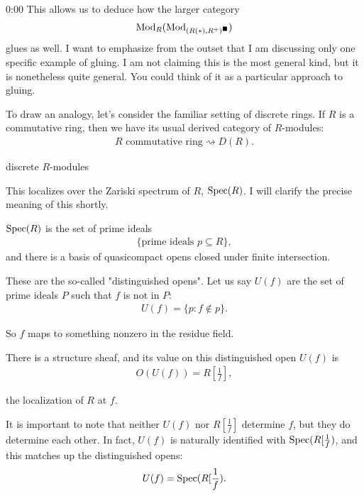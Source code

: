 \begin{unfinished}{0:00}
This allows us to deduce how the larger category
\begin{align*}
\operatorname{Mod}_R (\operatorname{Mod}_{(R(\ast),R^+)^\blacksquare})
\end{align*} 
glues as well. 
I want to emphasize from the outset that I am discussing only one specific example of gluing. I am not claiming this is the most general kind, but it is nonetheless quite general. You could think of it as a particular approach to gluing.

To draw an analogy, let's consider the familiar setting of discrete rings. If $R$ is a commutative ring, then we have its usual derived category of $R$-modules:
\begin{align*}
R \text{ commutative ring} \rightsquigarrow D(R).
\end{align*}

\begin{remark}
discrete $R$-modules
\end{remark}

This localizes over the Zariski spectrum of $R$, $\operatorname{Spec}(R)$. I will clarify the precise meaning of this shortly.

$\operatorname{Spec}(R)$ is the set of prime ideals 
\begin{align*}
\{ \text{prime ideals } p \subseteq R  \},
\end{align*}
and there is a basis of quasicompact opens closed under finite intersection.

These are the so-called "distinguished opens". Let us say $U(f)$ are the set of prime ideals $P$ such that $f$ is not in $P$:
\begin{align*}
U(f) = \{ p: f \notin p \}.
\end{align*}

So $f$ maps to something nonzero in the residue field.

There is a structure sheaf, and its value on this distinguished open $U(f)$ is 
\begin{align*}
O(U(f)) = R[\frac{1}{f}], 
\end{align*}

the localization of $R$ at $f$. 

It is important to note that neither $U(f)$ nor $R[\frac{1}{f}]$ determine $f$, but they do determine each other. In fact, $U(f)$ is naturally identified with $\operatorname{Spec}(R[\frac{1}{f})$, and this matches up the distinguished opens:
\begin{align*}
U(f) = \operatorname{Spec}(R[\frac{1}{f}).
\end{align*}


\end{unfinished}

